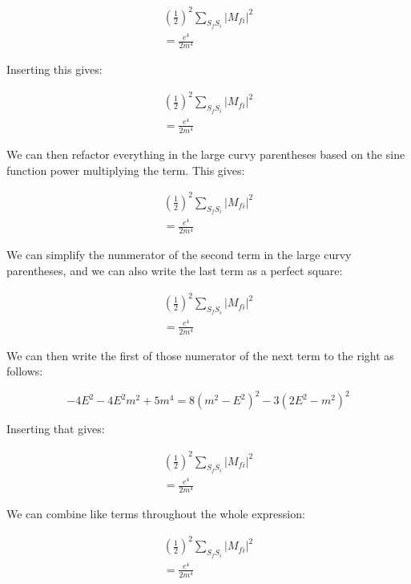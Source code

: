 \documentclass[a4]{article}
\begin{document}
    \begin{eqnarray}
        (\frac{1}{2})^2 \sum_{S_f S_i} |M_{f i}|^2 \\
        = \frac{e^4}{2 m^4}
    \end{eqnarray}

    Inserting this gives:

    \begin{eqnarray}
        (\frac{1}{2})^2 \sum_{S_f S_i} |M_{f i}|^2 \\
        = \frac{e^4}{2 m^4}
    \end{eqnarray}

    We can then refactor everything in the large curvy parentheses based on the sine function power multiplying the term. This gives:

    \begin{eqnarray}
        (\frac{1}{2})^2 \sum_{S_f S_i} |M_{f i}|^2 \\
        = \frac{e^4}{2 m^4}
    \end{eqnarray}

    We can simplify the nunmerator of the second term in the large curvy parentheses, and we can also write the last term as a perfect square:

    \begin{eqnarray}
        (\frac{1}{2})^2 \sum_{S_f S_i} |M_{f i}|^2 \\
        = \frac{e^4}{2 m^4}
    \end{eqnarray}

    We can then write the first of those numerator of the next term to the right as follows:

    \begin{equation}
        -4 E^2 - 4E^2 m^2 + 5 m^4 = 8 (m^2 - E^2)^2 - 3(2 E^2 - m^2)^2
    \end{equation}

    Inserting that gives:

    \begin{eqnarray}
        (\frac{1}{2})^2 \sum_{S_f S_i} |M_{f i}|^2 \\
        = \frac{e^4}{2 m^4}
    \end{eqnarray}

    We can combine like terms throughout the whole expression:

    \begin{eqnarray}
        (\frac{1}{2})^2 \sum_{S_f S_i} |M_{f i}|^2 \\
        = \frac{e^4}{2 m^4}
    \end{eqnarray}
\end{document}
